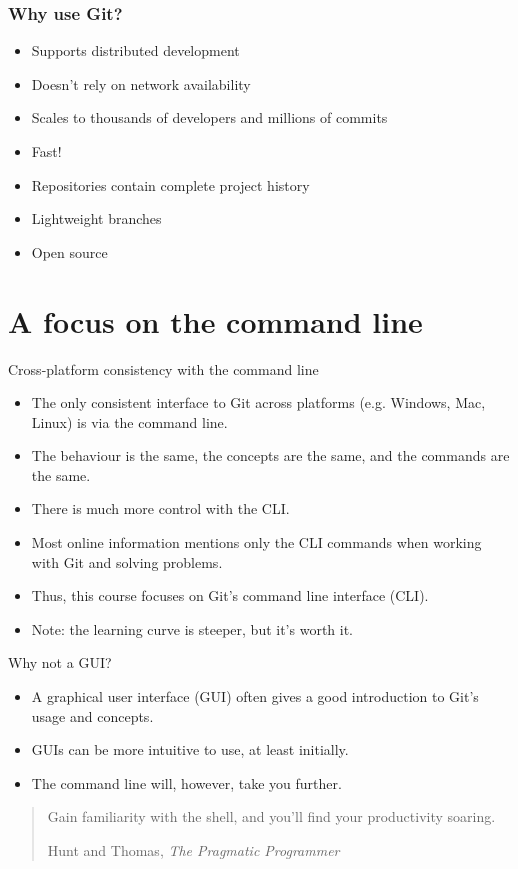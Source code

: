 \begin{frame}
    \frametitle{Why use Git?}
    \begin{itemize}
        \item Supports distributed development
        \item Doesn't rely on network availability
        \item Scales to thousands of developers and millions of commits
        \item Fast!
        \item Repositories contain complete project history
        \item Lightweight branches
        \item Open source
    \end{itemize}
\end{frame}

\section{A focus on the command line}

\begin{frame}{Cross-platform consistency with the command line}
    \begin{itemize}
        \item The only consistent interface to Git across platforms (e.g.
            Windows, Mac, Linux) is via the command line.
        \item The behaviour is the same, the concepts are the same, and the
            commands are the same.
        \item There is much more control with the CLI.
        \item Most online information mentions only the CLI commands when
            working with Git and solving problems.
        \item Thus, this course focuses on Git's command line interface
            (CLI).
        \item Note: the learning curve is steeper, but it's worth it.
    \end{itemize}
\end{frame}

\begin{frame}{Why not a GUI?}
    \begin{itemize}
        \item A graphical user interface (GUI) often gives a good
            introduction to Git's usage and concepts.
        \item GUIs can be more intuitive to use, at least initially.
        \item The command line will, however, take you further.
    \end{itemize}

    \blockquote[Hunt and Thomas, \emph{The Pragmatic Programmer}]
    {Gain familiarity with the shell, and you'll find your productivity soaring.}
\end{frame}

